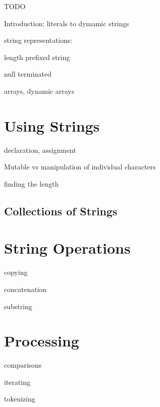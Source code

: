 

TODO

Introduction: literals to dymamic strings

string representations:

length prefixed string

null terminated

arrays, dynamic arrays

\section{Using Strings}

declaration, assignment

Mutable vs manipulation of individual characters

finding the length 

\subsection{Collections of Strings}

\section{String Operations}

copying 

concatenation

substring

\section{Processing}

comparisons

iterating

tokenizing

